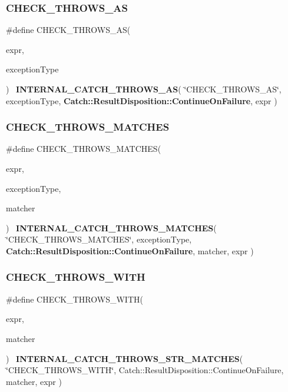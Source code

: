 \mbox{\label{catch_8hpp_a1fb6439098d2a12bb69188034e03baf2}} 
\subsubsection{CHECK\_THROWS\_AS}
{\footnotesize\ttfamily \#define C\+H\+E\+C\+K\+\_\+\+T\+H\+R\+O\+W\+S\+\_\+\+AS(\begin{DoxyParamCaption}\item[{}]{expr,  }\item[{}]{exception\+Type }\end{DoxyParamCaption})~\textbf{ I\+N\+T\+E\+R\+N\+A\+L\+\_\+\+C\+A\+T\+C\+H\+\_\+\+T\+H\+R\+O\+W\+S\+\_\+\+AS}( \char`\"{}C\+H\+E\+C\+K\+\_\+\+T\+H\+R\+O\+W\+S\+\_\+\+AS\char`\"{}, exception\+Type, \textbf{ Catch\+::\+Result\+Disposition\+::\+Continue\+On\+Failure}, expr )}

\mbox{\label{catch_8hpp_a74fcc14d39e8cc35ff39f69c5b60e375}} 
\subsubsection{CHECK\_THROWS\_MATCHES}
{\footnotesize\ttfamily \#define C\+H\+E\+C\+K\+\_\+\+T\+H\+R\+O\+W\+S\+\_\+\+M\+A\+T\+C\+H\+ES(\begin{DoxyParamCaption}\item[{}]{expr,  }\item[{}]{exception\+Type,  }\item[{}]{matcher }\end{DoxyParamCaption})~\textbf{ I\+N\+T\+E\+R\+N\+A\+L\+\_\+\+C\+A\+T\+C\+H\+\_\+\+T\+H\+R\+O\+W\+S\+\_\+\+M\+A\+T\+C\+H\+ES}( \char`\"{}C\+H\+E\+C\+K\+\_\+\+T\+H\+R\+O\+W\+S\+\_\+\+M\+A\+T\+C\+H\+ES\char`\"{}, exception\+Type, \textbf{ Catch\+::\+Result\+Disposition\+::\+Continue\+On\+Failure}, matcher, expr )}

\mbox{\label{catch_8hpp_a4903733490f526b58053836575e99066}} 
\subsubsection{CHECK\_THROWS\_WITH}
{\footnotesize\ttfamily \#define C\+H\+E\+C\+K\+\_\+\+T\+H\+R\+O\+W\+S\+\_\+\+W\+I\+TH(\begin{DoxyParamCaption}\item[{}]{expr,  }\item[{}]{matcher }\end{DoxyParamCaption})~\textbf{ I\+N\+T\+E\+R\+N\+A\+L\+\_\+\+C\+A\+T\+C\+H\+\_\+\+T\+H\+R\+O\+W\+S\+\_\+\+S\+T\+R\+\_\+\+M\+A\+T\+C\+H\+ES}( \char`\"{}C\+H\+E\+C\+K\+\_\+\+T\+H\+R\+O\+W\+S\+\_\+\+W\+I\+TH\char`\"{}, Catch\+::\+Result\+Disposition\+::\+Continue\+On\+Failure, matcher, expr )}

